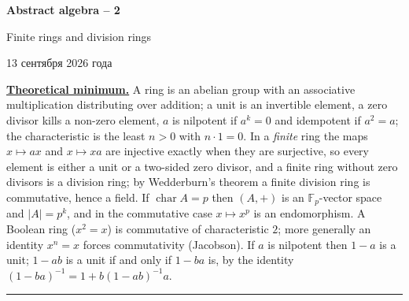 \documentclass[11pt,a4paper]{article}
\newcommand{\head}[1]{\par\medskip\noindent\textbf{\underline{#1}}\quad}
\newcommand{\sheettitle}[3]{%
  \begin{center}
  {\huge\bfseries #1\par}\vspace{1.2em}
  {\Large #2\par}\vspace{0.8em}
  \if\relax\detokenize{#3}\relax\else{\Large #3\par}\vspace{0.8em}\fi
  {\foreignlanguage{russian}{13 сентября 2026 года}\par}
  \end{center}\vspace{0.5em}}
\newcommand{\F}{\mathbb F}
\DeclareMathOperator{\chr}{char}
\begin{document}
\sheettitle{Abstract algebra -- 2}{Finite rings and division rings}{Homework}

\head{Theoretical minimum.} A ring is an abelian group with an associative multiplication
distributing over addition; a unit is an invertible element, a zero divisor kills a non-zero
element, $a$ is nilpotent if $a^k=0$ and idempotent if $a^2=a$; the characteristic is the least
$n>0$ with $n\cdot1=0$. In a \emph{finite} ring the maps $x\mapsto ax$ and $x\mapsto xa$ are
injective exactly when they are surjective, so every element is either a unit or a two-sided
zero divisor, and a finite ring without zero divisors is a division ring; by Wedderburn's
theorem a finite division ring is commutative, hence a field. If $\chr A=p$ then $(A,+)$ is an
$\F_p$-vector space and $|A|=p^k$, and in the commutative case $x\mapsto x^p$ is an
endomorphism. A Boolean ring ($x^2=x$) is commutative of characteristic $2$; more generally an
identity $x^n=x$ forces commutativity (Jacobson). If $a$ is nilpotent then $1-a$ is a unit;
$1-ab$ is a unit if and only if $1-ba$ is, by the identity $(1-ba)^{-1}=1+b(1-ab)^{-1}a$.

\medskip\noindent\rule{\linewidth}{0.4pt}
\end{document}
